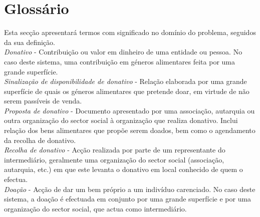 \section{Glossário}

Esta secção apresentará termos com significado no domínio do problema, seguidos da sua definição.\\

\textit{Donativo} - Contribuição ou valor em dinheiro de uma entidade ou pessoa. No caso deste sistema, uma contribuição em géneros alimentares feita por uma grande superfície.\\

\textit{Sinalização de disponibilidade de donativo} - Relação elaborada por uma grande superfície de quais os géneros alimentares que pretende doar, em virtude de não serem passíveis de venda.\\

\textit{Proposta de donativo} - Documento apresentado por uma associação, autarquia ou outra organização do sector social à organização que realiza donativo. Inclui relação dos bens alimentares que propõe serem doados, bem como o agendamento da recolha de donativo.\\

\textit{Recolha de donativo} - Acção realizada por parte de um representante do intermediário, geralmente uma organização do sector social (associação, autarquia, etc.) em que este levanta o donativo em local conhecido de quem o efectua.\\

\textit{Doação} - Acção de dar um bem próprio a um indivíduo carenciado. No caso deste sistema, a doação é efectuada em conjunto por uma grande superfície e por uma organização do sector social, que actua como intermediário.\\

\clearpage